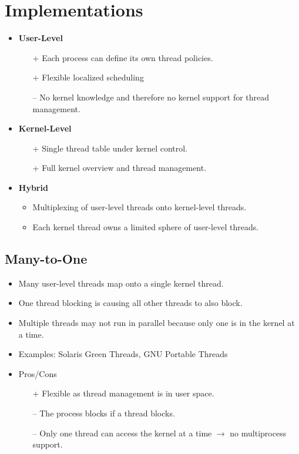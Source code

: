     \section{Implementations}
        \begin{itemize}
        	\item \textbf{User-Level}
            	\begin{itemize}
            		\item[+] Each process can define its own thread policies.
            		\item[+] Flexible localized scheduling
            		\item[--] No kernel knowledge and therefore no kernel support for thread management.
            	\end{itemize}
        	\item \textbf{Kernel-Level}
            	\begin{itemize}
            		\item[+] Single thread table under kernel control.
            		\item[+] Full kernel overview and thread management.
            	\end{itemize}
        	\item \textbf{Hybrid}
            	\begin{itemize}
            		\item Multiplexing of user-level threads onto kernel-level threads.
            		\item Each kernel thread owns a limited sphere of user-level threads.
            	\end{itemize}
        \end{itemize}

        \subsection{Many-to-One}
            \begin{itemize}
            	\item Many user-level threads map onto a single kernel thread.
            	\item One thread blocking is causing all other threads to also block.
            	\item Multiple threads may not run in parallel because only one is in the kernel at a time.
            	\item Examples: Solaris Green Threads, GNU Portable Threads
            	\item Pros/Cons
                	\begin{itemize}
                		\item[+] Flexible as thread management is in user space.
                		\item[--] The process blocks if a thread blocks.
                		\item[--] Only one thread can access the kernel at a time \(\rightarrow\) no multiprocess support.
                	\end{itemize}
            \end{itemize}

